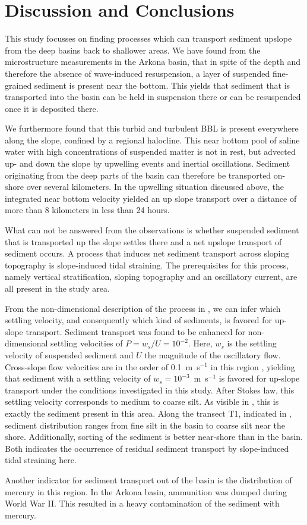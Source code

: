 \section{Discussion and Conclusions}

This study focusses on finding processes which can transport sediment upslope 
from the deep basins back to shallower areas. We have found from the 
microstructure measurements in the Arkona basin, that in spite of the depth and 
therefore the absence of wave-induced resuspension, a layer of 
suspended fine-grained sediment is present near the bottom. This yields that 
sediment that is transported into the basin can be held in suspension there 
or can be resuspended once it is deposited there.

We furthermore found that this turbid and turbulent BBL is present everywhere 
along the slope, confined by a regional halocline. This near bottom pool of 
saline water with high concentrations of suspended matter is not in rest, but 
advected up- and down the slope by upwelling events and inertial oscillations. 
Sediment originating from the deep parts of the basin can therefore be 
transported on-shore over several kilometers. In the upwelling situation 
discussed above, the integrated near bottom velocity yielded an up slope 
transport over a distance of more than 8 kilometers in less than 24 hours. 

What can not be answered from the observations is whether suspended sediment 
that is transported up the slope settles there and a net upslope transport of 
sediment occurs. A process that induces net sediment transport across sloping 
topography is slope-induced tidal straining. The prerequisites for this 
process, namely vertical stratification, sloping topography and an oscillatory 
current, are all present in the study area. 

From the non-dimensional description of the process in \cite{schulzumlauf2016}, 
we can infer which settling velocity, and consequently which kind of sediments, 
is favored for up-slope transport. Sediment transport was found 
to be enhanced for non-dimensional settling velocities of $P= w_s \slash U = 
10^{-2}$. Here, $w_s$ is the settling velocity of suspended sediment and $U$ 
the magnitude of the oscillatory flow. Cross-slope flow velocities are in the 
order of 0.1~m~s$^{-1}$ in this region \citep[][]{lasslass1993}, yielding that 
sediment with a settling velocity of $w_s=10^{-3}$~m~s$^{-1}$ is favored for 
up-slope transport under the conditions investigated in this study. After 
Stokes law, this settling velocity corresponds to medium to coarse silt. As 
visible in , this is exactly the sediment present in this 
area. Along the transect T1, indicated in , sediment 
distribution ranges from fine silt in the basin to coarse silt near the shore. 
Additionally, sorting of the sediment is better near-shore than in the basin. 
Both indicates the occurrence of residual sediment transport by slope-induced 
tidal straining here.

Another indicator for sediment transport out of the basin is the distribution 
of mercury in this region. In the Arkona basin, ammunition was dumped during 
World War II. This resulted in a heavy contamination of the sediment with 
mercury. 